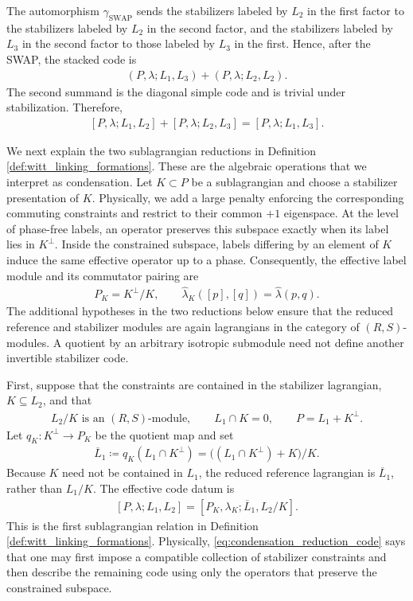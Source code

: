 \documentclass[sn-mathphys-num]{sn-jnl}
\theoremstyle{definition}
\numberwithin{equation}{section}
\theoremstyle{definition}
\def\l{{\lambda}}
\def\hl{{\hat \lambda}}
\begin{document}
The automorphism $\gamma_{\mathrm{SWAP}}$ sends the stabilizers labeled by $L_2$ in the first factor to the
stabilizers labeled by $L_2$ in the second factor, and the stabilizers
labeled by $L_3$ in the second factor to those labeled by $L_3$ in the
first. Hence, after the SWAP, the stacked code is
\begin{align}
    (P,\l;L_1,L_3)+(P,\l;L_2,L_2).
\end{align}
The second summand is the diagonal simple code and is trivial under
stabilization. Therefore,
\begin{align}\label{eq:Maslov_rel_codes}
    [P,\l;L_1,L_2]+[P,\l;L_2,L_3]
    =
    [P,\l;L_1,L_3].
\end{align}

We next explain the two sublagrangian reductions in Definition
\ref{def:witt_linking_formations}. These are the algebraic operations that we
interpret as condensation. Let $K\subset P$ be a sublagrangian and choose a
stabilizer presentation of $K$. Physically, we add a large penalty enforcing
the corresponding commuting constraints and restrict to their common $+1$
eigenspace. At the level of phase-free labels, an operator preserves this
subspace exactly when its label lies in $K^{\perp}$. Inside the constrained
subspace, labels differing by an element of $K$ induce the same effective
operator up to a phase. Consequently, the effective label module and its
commutator pairing are
\begin{align}\label{eq:physical_sublagrangian_reduction}
    P_K=K^{\perp}/K,
    \qquad
    \hl_K([p],[q])=\hl(p,q).
\end{align}
The additional hypotheses in the two reductions below ensure that the
reduced reference and stabilizer modules are again lagrangians in the category
of $(R,S)$-modules. A quotient by an arbitrary isotropic submodule need not
define another invertible stabilizer code.

First, suppose that the constraints are contained in the stabilizer
lagrangian, $K\subseteq L_2$, and that
\begin{align}\label{eq:first_condensation_hypotheses}
    L_2/K\text{ is an }(R,S)\text{-module},
    \qquad
    L_1\cap K=0,
    \qquad
    P=L_1+K^{\perp}.
\end{align}
Let $q_K:K^{\perp}\to P_K$ be the quotient map and set
\begin{align}
    \overline{L}_1
    \coloneqq q_K(L_1\cap K^{\perp})
    =\bigl((L_1\cap K^{\perp})+K\bigr)/K.
\end{align}
Because $K$ need not be contained in $L_1$, the reduced reference lagrangian
is $\overline{L}_1$, rather than $L_1/K$. The effective code datum is
\begin{align}\label{eq:condensation_reduction_code}
    [P,\l;L_1,L_2]
    =
    [P_K,\l_K;\overline{L}_1,L_2/K].
\end{align}
This is the first sublagrangian relation in Definition
\ref{def:witt_linking_formations}. Physically, \eqref{eq:condensation_reduction_code} says that one
may first impose a compatible collection of stabilizer constraints and then
describe the remaining code using only the operators that preserve the
constrained subspace.
\end{document}
